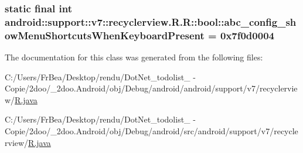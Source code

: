 \hypertarget{classandroid_1_1support_1_1v7_1_1recyclerview_1_1_r_1_1bool_aa2736793259d34a41bf7ef929c154c3}{
\subsubsection[{abc\_\-config\_\-showMenuShortcutsWhenKeyboardPresent}]{\setlength{\rightskip}{0pt plus 5cm}static final int android::support::v7::recyclerview.R.R::bool::abc\_\-config\_\-showMenuShortcutsWhenKeyboardPresent = 0x7f0d0004}}
\label{classandroid_1_1support_1_1v7_1_1recyclerview_1_1_r_1_1bool_aa2736793259d34a41bf7ef929c154c3}




The documentation for this class was generated from the following files:\begin{CompactItemize}
\item 
C:/Users/FrBea/Desktop/rendu/DotNet\_\-todolist\_ - Copie/2doo/\_\-2doo.Android/obj/Debug/android/android/support/v7/recyclerview/\hyperlink{android_2support_2v7_2recyclerview_2_r_8java}{R.java}\item 
C:/Users/FrBea/Desktop/rendu/DotNet\_\-todolist\_ - Copie/2doo/\_\-2doo.Android/obj/Debug/android/src/android/support/v7/recyclerview/\hyperlink{src_2android_2support_2v7_2recyclerview_2_r_8java}{R.java}\end{CompactItemize}
